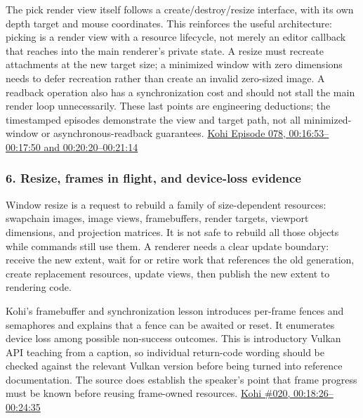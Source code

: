 The pick render view itself follows a create/destroy/resize interface, with its own depth target and mouse coordinates. This reinforces the useful architecture: picking is a render view with a resource lifecycle, not merely an editor callback that reaches into the main renderer's private state. A resize must recreate attachments at the new target size; a minimized window with zero dimensions needs to defer recreation rather than create an invalid zero-sized image. A readback operation also has a synchronization cost and should not stall the main render loop unnecessarily. These last points are engineering deductions; the timestamped episodes demonstrate the view and target path, not all minimized-window or asynchronous-readback guarantees. \href{https://www.youtube.com/watch?v=mx1TyxNFrdo&t=16m53s}{Kohi Episode 078, 00:16:53--00:17:50 and 00:20:20--00:21:14}

\subsubsection{6. Resize, frames in flight, and device-loss evidence}\label{resize-frames-in-flight-and-device-loss-evidence}

Window resize is a request to rebuild a family of size-dependent resources: swapchain images, image views, framebuffers, render targets, viewport dimensions, and projection matrices. It is not safe to rebuild all those objects while commands still use them. A renderer needs a clear update boundary: receive the new extent, wait for or retire work that references the old generation, create replacement resources, update views, then publish the new extent to rendering code.

Kohi's framebuffer and synchronization lesson introduces per-frame fences and semaphores and explains that a fence can be awaited or reset. It enumerates device loss among possible non-success outcomes. This is introductory Vulkan API teaching from a caption, so individual return-code wording should be checked against the relevant Vulkan version before being turned into reference documentation. The source does establish the speaker's point that frame progress must be known before reusing frame-owned resources. \href{https://www.youtube.com/watch?v=Is6CwlsaCFE&t=18m26s}{Kohi \#020, 00:18:26--00:24:35}

